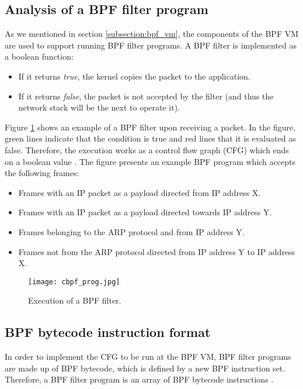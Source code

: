 \subsection{Analysis of a BPF filter program} \label{subsection:analysis_bpf_filter_prog}
As we mentioned in section \ref{subsection:bpf_vm}, the components of the BPF VM are used to support running BPF filter programs. A BPF filter is implemented as a boolean function:
\begin{itemize}
\item If it returns \textit{true}, the kernel copies the packet to the application.
\item If it returns \textit{false}, the packet is not accepted by the filter (and thus the network stack will be the next to operate it).
\end{itemize}

Figure \ref{fig:cbpf_prog} shows an example of a BPF filter upon receiving a packet. In the figure, green lines indicate that the condition is true and red lines that it is evaluated as false. Therefore, the execution works as a control flow graph (CFG) which ends on a boolean value \cite{bpf_bsd_origin_bpf_page5}. The figure presents an example BPF program which accepts the following frames:
\begin{itemize}
\item Frames with an IP packet as a payload directed from IP address X.
\item Frames with an IP packet as a payload directed towards IP address Y.
\item Frames belonging to the ARP protocol and from IP address Y.
\item Frames not from the ARP protocol directed from IP address Y to IP address X.
\end{itemize}

\begin{figure}[ht]
	\centering
	\texttt{[image: cbpf\_prog.jpg]}
	\caption{Execution of a BPF filter.}
	\label{fig:cbpf_prog}
\end{figure}


\subsection{BPF bytecode instruction format}
In order to implement the CFG to be run at the BPF VM, BPF filter programs are made up of BPF bytecode, which is defined by a new BPF instruction set. Therefore, a BPF filter program is an array of BPF bytecode instructions \cite{bpf_organicprogrammer_analysis}.



